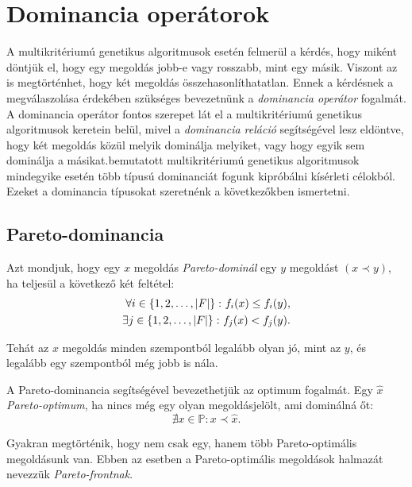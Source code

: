 \section{Dominancia operátorok}
A multikritériumú genetikus algoritmusok esetén felmerül a kérdés, hogy miként döntjük el, hogy egy megoldás jobb-e vagy rosszabb, mint egy másik.
Viszont az is megtörténhet, hogy két megoldás összehasonlíthatatlan.
Ennek a kérdésnek a megválaszolása érdekében szükséges bevezetnünk a \emph{dominancia operátor} fogalmát.
A dominancia operátor fontos szerepet lát el a multikritériumú genetikus algoritmusok keretein belül,
mivel a \emph{dominancia reláció} segítségével lesz eldöntve, hogy két megoldás közül melyik dominálja melyiket, vagy hogy egyik sem dominálja a másikat.bemutatott multikritériumú genetikus algoritmusok mindegyike esetén több típusú dominanciát fogunk kipróbálni kísérleti célokból.
Ezeket a dominancia típusokat szeretnénk a következőkben ismertetni.


\subsection{Pareto-dominancia}
\begin{ert}
  Azt mondjuk, hogy egy $x$ megoldás \emph{Pareto-dominál} egy $y$ megoldást $\left( x \prec y \right)$, ha teljesül a következő két feltétel:
  \begin{align*}
    \forall i \in \left\{ 1, 2, \dots, \lvert F\rvert \right\} \colon f_i(x) \leq f_i(y), \\
    \exists j \in \left\{ 1, 2, \dots, \lvert F\rvert \right\} \colon f_j(x) < f_j(y).
  \end{align*}

  Tehát az $x$ megoldás minden szempontból legalább olyan jó, mint az $y$, és legalább egy szempontból még jobb is nála.
\end{ert}


\begin{ert}
  A Pareto-dominancia segítségével bevezethetjük az optimum fogalmát.
  Egy $\hat{x}$ \emph{Pareto-optimum}, ha nincs még egy olyan megoldásjelölt, ami dominálná őt:
  \[
    \nexists x \in \mathbb{P} \colon x \prec \hat{x}.
  \]
\end{ert}


\begin{ert}
  Gyakran megtörténik, hogy nem csak egy, hanem több Pareto-optimális megoldásunk van.
  Ebben az esetben a Pareto-optimális megoldások halmazát nevezzük \emph{Pareto-frontnak}.
\end{ert}


